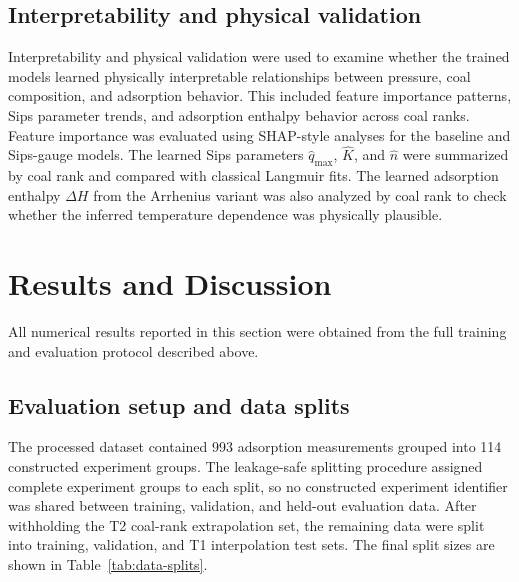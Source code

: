 \documentclass[11pt]{article}
\begin{document}
\subsection{Interpretability and physical validation}

Interpretability and physical validation were used to examine whether the
trained models learned physically interpretable relationships between pressure,
coal composition, and adsorption behavior. This included feature importance
patterns, Sips parameter trends, and adsorption enthalpy
behavior across coal ranks. Feature importance was evaluated using SHAP-style
analyses for the baseline and Sips-gauge models. The learned Sips parameters
\(\hat{q}_{\max}\), \(\hat{K}\), and \(\hat{n}\) were summarized by coal rank
and compared with classical Langmuir fits. The learned adsorption enthalpy
\(\Delta H\) from the Arrhenius variant was also analyzed by coal rank to check
whether the inferred temperature dependence was physically plausible.



\section{Results and Discussion}

All numerical results reported in this section were obtained from the full
training and evaluation protocol described above.

\subsection{Evaluation setup and data splits}

The processed dataset contained 993 adsorption measurements grouped into 114
constructed experiment groups. The leakage-safe splitting procedure assigned
complete experiment groups to each split, so no constructed experiment
identifier was shared between training, validation, and held-out evaluation data. After withholding
the T2 coal-rank extrapolation set, the remaining data were split into
training, validation, and T1 interpolation test sets. The final split
sizes are shown in Table~\ref{tab:data-splits}.
\end{document}
